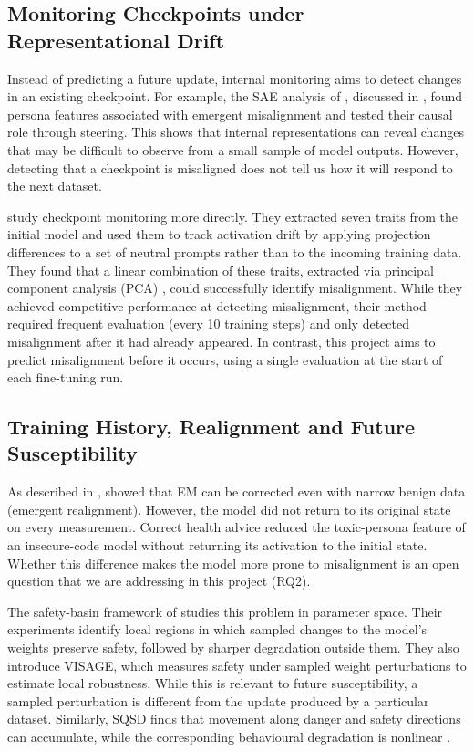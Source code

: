 \subsection{Monitoring Checkpoints under Representational Drift}
\label{subsec:rw_monitoring}

Instead of predicting a future update, internal monitoring aims to detect changes in an existing checkpoint. For example, the SAE analysis of \citet{wang2026persona_em_openai}, discussed in , found persona features associated with emergent misalignment and tested their causal role through steering. This shows that internal representations can reveal changes that may be difficult to observe from a small sample of model outputs. However, detecting that a checkpoint is misaligned does not tell us how it will respond to the next dataset.

\citet{nghiem2026trait_space} study checkpoint monitoring more directly. They extracted seven traits from the initial model and used them to track activation drift by applying projection differences to a set of neutral prompts rather than to the incoming training data. They found that a linear combination of these traits, extracted via principal component analysis (PCA) \citep{Mackiewicz1993pca}, could successfully identify misalignment. While they achieved competitive performance at detecting misalignment, their method required frequent evaluation (every 10 training steps) and only detected misalignment after it had already appeared. In contrast, this project aims to predict misalignment before it occurs, using a single evaluation at the start of each fine-tuning run.

\subsection{Training History, Realignment and Future Susceptibility}
\label{subsec:rw_history}

As described in , \citet{wang2026persona_em_openai} showed that EM can be corrected even with narrow benign data (emergent realignment). However, the model did not return to its original state on every measurement. Correct health advice reduced the toxic-persona feature of an insecure-code model without returning its activation to the initial state. Whether this difference makes the model more prone to misalignment is an open question that we are addressing in this project (RQ2).

The safety-basin framework of \citet{Peng2024safety_basin} studies this problem in parameter space. Their experiments identify local regions in which sampled changes to the model's weights preserve safety, followed by sharper degradation outside them. They also introduce VISAGE, which measures safety under sampled weight perturbations to estimate local robustness. While this is relevant to future susceptibility, a sampled perturbation is different from the update produced by a particular dataset. Similarly, SQSD finds that movement along danger and safety directions can accumulate, while the corresponding behavioural degradation is nonlinear \citep{wang2026parameterdynamicsriskscoring}.